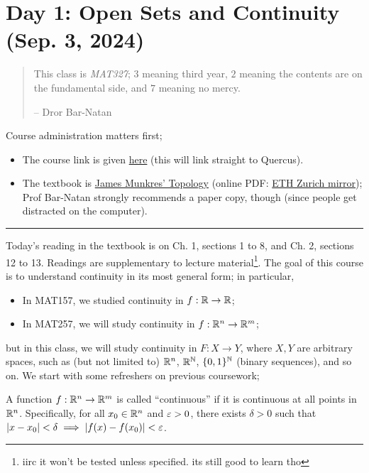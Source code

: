 \section{Day 1: Open Sets and Continuity (Sep. 3, 2024)}
\begin{abstract}
    \sffamily\small
    \noindent This class is \textit{MAT327}; $3$ meaning third year, $2$ meaning the contents are on the fundamental side, and $7$ meaning no mercy.

    -- Dror Bar-Natan
\end{abstract}

Course administration matters first;
\begin{itemize}
    \item The course link is given \href{https://drorbn.net/24-327}{here} (this will link straight to Quercus).
    \item The textbook is \href{https://www.pearson.com/en-ca/subject-catalog/p/topology-classic-version/P200000006299/9780137848669}{James Munkres' Topology} (online PDF: \href{https://people.math.ethz.ch/~dkosanovic/24-FS/Munkres-Topology.pdf}{ETH Zurich mirror}); Prof Bar-Natan strongly recommends a paper copy, though (since people get distracted on the computer).
\end{itemize}

\hrule \bigskip

\noindent Today's reading in the textbook is on Ch. 1, sections 1 to 8, and Ch. 2, sections 12 to 13. Readings are supplementary to lecture material\footnote{iirc it won't be tested unless specified. its still good to learn tho}. The goal of this course is to understand continuity in its most general form; in particular,
\begin{itemize}
    \item In MAT157, we studied continuity in $f : \mathbb R \to \mathbb R$;
    \item In MAT257, we will study continuity in $f : \mathbb R^n \to \mathbb R^m$;
\end{itemize} 
but in this class, we will study continuity in $F : X \to Y$, where $X, Y$ are arbitrary spaces, such as (but not limited to) $\mathbb R^n$, $\mathbb R^\mathbb N$, $\{0, 1\}^\mathbb N$ (binary sequences), and so on. We start with some refreshers on previous coursework;

\begin{definition}[Continuity in $\RR^n \to \RR^m$]
    A function $f : \mathbb R^n \to \mathbb R^m$ is called ``continuous'' if it is continuous at all points in $\mathbb R^n$. Specifically, for all $x_0 \in \mathbb R^n$ and $\varepsilon > 0$, there exists $\delta > 0$ such that $\left\lvert x - x_0 \right\rvert < \delta \implies \left\lvert f(x) - f(x_0) \right\rvert < \varepsilon$.
\end{definition}

